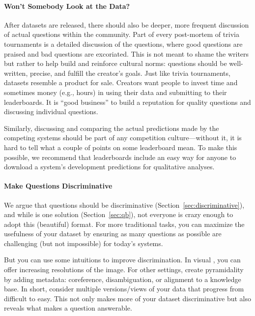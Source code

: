 \paragraph{Won't Somebody Look at the Data?}

After  datasets are released, there should also be deeper, more frequent discussion of actual questions within the  community.
Part of every post-mortem of trivia tournaments is a detailed discussion of the questions, where good questions are praised and bad questions are excoriated.
This is not meant to shame the writers but rather to help build and reinforce cultural norms: questions should be well-written, precise, and fulfill the creator's goals.
Just like trivia tournaments,  datasets resemble a product for sale.
Creators want people to invest time and sometimes money (e.g.,  hours) in using their data and submitting to their leaderboards.
It is ``good business'' to build a reputation for quality questions and discussing individual questions.

Similarly, discussing and comparing the actual predictions made by the competing systems should be part of
any competition culture---without it, it is hard to tell what a couple of points
on some leaderboard mean.  To make this possible, we recommend that leaderboards include an
easy way for anyone to download a system's development predictions for qualitative analyses.

\paragraph{Make Questions Discriminative}

We argue that questions should be discriminative (Section~\ref{sec:discriminative}), and while \qb{} is one solution (Section~\ref{sec:qb}), not everyone is crazy enough to adopt this (beautiful) format.
For more traditional  tasks, you can maximize the usefulness of your dataset by ensuring as many questions as possible are challenging (but not impossible) for today's  systems.

But you can use some \qb{} intuitions to improve discrimination.
In visual , you can offer increasing resolutions of the image.
For other settings, create pyramidality by adding metadata: coreference, disambiguation, or alignment to a knowledge base.
In short, consider multiple versions/views of your data that progress from difficult to easy.
This not only makes more of your dataset discriminative but also reveals what makes a question answerable.

